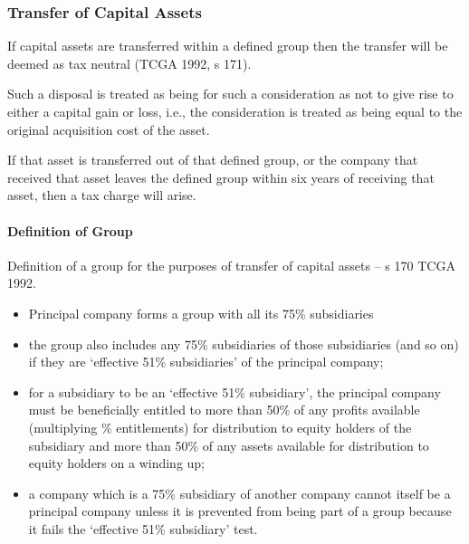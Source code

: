 \documentclass[
]{article}
\newenvironment{Shaded}{}{}
\newcommand{\NormalTok}[1]{#1}
\providecommand{\tightlist}{%
  \setlength{\itemsep}{0pt}\setlength{\parskip}{0pt}}
\begin{document}
\hypertarget{transfer-of-capital-assets}{%
\subsubsection{Transfer of Capital
Assets}\label{transfer-of-capital-assets}}

If capital assets are transferred within a defined group then the
transfer will be deemed as tax neutral (TCGA 1992, s 171).

Such a disposal is treated as being for such a consideration as not to
give rise to either a capital gain or loss, i.e., the consideration is
treated as being equal to the original acquisition cost of the asset.

\begin{Shaded}
\begin{Highlighting}[]
\NormalTok{If that asset is transferred out of that defined group, or the company that received that asset leaves the defined group within six years of receiving that asset, then a tax charge will arise.}
\end{Highlighting}
\end{Shaded}

\hypertarget{definition-of-group-1}{%
\paragraph{Definition of Group}\label{definition-of-group-1}}

Definition of a group for the purposes of transfer of capital assets --
s 170 TCGA 1992.

\begin{itemize}
\tightlist
\item
  Principal company forms a group with all its 75\% subsidiaries
\item
  the group also includes any 75\% subsidiaries of those subsidiaries
  (and so on) if they are `effective 51\% subsidiaries' of the principal
  company;
\item
  for a subsidiary to be an `effective 51\% subsidiary', the principal
  company must be beneficially entitled to more than 50\% of any profits
  available (multiplying \% entitlements) for distribution to equity
  holders of the subsidiary and more than 50\% of any assets available
  for distribution to equity holders on a winding up;
\item
  a company which is a 75\% subsidiary of another company cannot itself
  be a principal company unless it is prevented from being part of a
  group because it fails the `effective 51\% subsidiary' test.
\end{itemize}
\end{document}
